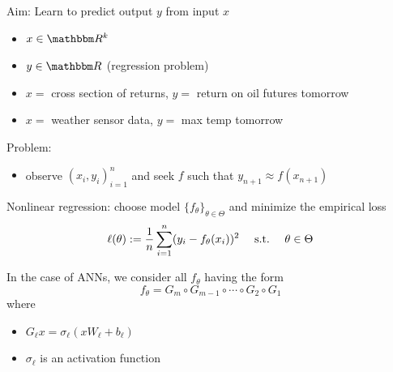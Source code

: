 \begin{frame}
    
    Aim: Learn to predict output $y$ from input $x$
    \begin{itemize}
        \item $x \in \RR^k$
        \vspace{0.5em}
        \item $y \in \RR$  (regression problem)
    \end{itemize}

    \Egs
    \begin{itemize}
        \item $x = $ cross section of returns, $y = $ return on oil futures tomorrow
        \vspace{0.5em}
        \item $x = $ weather sensor data, $y = $ max temp tomorrow
    \end{itemize}
        \vspace{0.5em}
        \vspace{0.5em}

    Problem:

    \begin{itemize}
        \item observe $(x_i, y_i)_{i=1}^n$ and seek $f$ such that $y_{n+1}
            \approx f(x_{n+1})$
    \end{itemize}


\end{frame}



\begin{frame}

    Nonlinear regression: choose model $\{f_\theta\}_{\theta \in \Theta}$ and minimize the empirical loss
    \begin{equation*}
        \ell(\theta) := \frac{1}{n}\sum_{i=1}^n (y_i - f_\theta(x_i))^2
        \quad \ \mathrm{s.t.}\  \quad \theta \in \Theta
    \end{equation*}


    \pause
    \vspace{0.5em}
    In the case of ANNs, we consider all $f_\theta$ having the form
    \begin{equation*}
        f_\theta
        = G_{m} \circ G_{m-1} \circ \cdots \circ G_{2}  \circ G_{1}
    \end{equation*}
    where
    \begin{itemize}
        \item $G_{\ell} x = \sigma_\ell(x W_\ell + b_\ell)$ 
        \vspace{0.5em}
        \item $\sigma_\ell$ is an activation function
    \end{itemize}

\end{frame}

